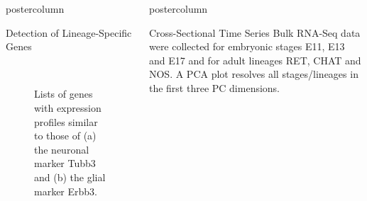 \documentclass{beamer}
\newlength{\columnheight}
\begin{document}
\begin{frame}
\begin{columns}
\begin{column}{.45\textwidth}
\begin{beamercolorbox}[center]{postercolumn}
\begin{minipage}{.98\textwidth}
{\begin{myblock}{Detection of Lineage-Specific Genes}
\begin{figure}
\begin{minipage}{0.7\textwidth}
	 \\
	\caption{Lists of genes with expression profiles similar to those of
			(a) the neuronal marker Tubb3 and (b) the glial marker Erbb3.}
	\label{fig:genebars}
\end{minipage}
\end{figure}
\end{myblock}\vfill
}\end{minipage}
\end{beamercolorbox}
\end{column}
\begin{column}{.45\textwidth}
\begin{beamercolorbox}[center]{postercolumn}
\begin{minipage}{.98\textwidth}
\parbox[t][\columnheight]{\textwidth}{
\begin{myblock}{Cross-Sectional Time Series}
Bulk RNA-Seq data were collected for embryonic stages E11, E13 and E17 and
for adult lineages RET, CHAT and NOS. A PCA plot resolves all stages/lineages
in the first three PC dimensions.
\begin{figure}

\end{figure}
\end{myblock}}
\end{minipage}
\end{beamercolorbox}
\end{column}
\end{columns}
\end{frame}
\end{document}
